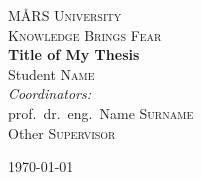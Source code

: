 \documentclass[a4paper,12pt]{article}
\begin{document}
\begin{titlepage}

\onehalfspacing

\begin{center}

\textsc{\Large MÅRS University}\\
\textsc{\Large Knowledge Brings Fear}\\[5cm]

\textbf
{\Huge Title of My Thesis}\\[4cm]

{\LARGE Student \textsc{Name}}\\[3cm]

\textit{\large Coordinators:}\\
{\Large {\large prof.\ dr.\ eng.\ }Name \textsc{Surname}}\\
{\Large Other \textsc{Supervisor}}\\

\vfill	%

{\Large \today}\\[1.5cm]

\end{center}

\end{titlepage}
\end{document}
